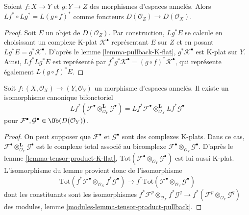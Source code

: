 \begin{lemma}

\label{lemma-derived-pullback-composition}
Soient $f : X \to Y$ et $g : Y \to Z$ des morphismes d'espaces annelés. Alors $Lf^* \circ Lg^* = L(g \circ f)^*$ comme foncteurs $D(\mathcal{O}_Z) \to D(\mathcal{O}_X)$.
\end{lemma}

\begin{proof}
Soit $E$ un objet de $D(\mathcal{O}_Z)$. Par construction, $Lg^*E$ se calcule en choisissant un complexe K-plat $\mathcal{K}^\bullet$ représentant $E$ sur $Z$ et en posant $Lg^*E = g^*\mathcal{K}^\bullet$. D'après le lemme \ref{lemma-pullback-K-flat}, $g^*\mathcal{K}^\bullet$ est K-plat sur $Y$. Ainsi, $Lf^*Lg^*E$ est représenté par $f^*g^*\mathcal{K}^\bullet = (g \circ f)^*\mathcal{K}^\bullet$, qui représente également $L(g \circ f)^*E$.
\end{proof}

\begin{lemma}

\label{lemma-pullback-tensor-product}
Soit $f : (X, \mathcal{O}_X) \to (Y, \mathcal{O}_Y)$ un morphisme d'espaces annelés. Il existe un isomorphisme canonique bifonctoriel $$
Lf^*(
\mathcal{F}^\bullet \otimes_{\mathcal{O}_Y}^{\mathbf{L}} \mathcal{G}^\bullet
) =
Lf^*\mathcal{F}^\bullet 
\otimes_{\mathcal{O}_X}^{\mathbf{L}}
Lf^*\mathcal{G}^\bullet 
$$ pour $\mathcal{F}^\bullet, \mathcal{G}^\bullet \in \Ob(D(\mathcal{O}_Y))$.
\end{lemma}

\begin{proof}
On peut supposer que $\mathcal{F}^\bullet$ et $\mathcal{G}^\bullet$ sont des complexes K-plats. Dans ce cas, $\mathcal{F}^\bullet \otimes_{\mathcal{O}_Y}^{\mathbf{L}} \mathcal{G}^\bullet$ est le complexe total associé au bicomplexe $\mathcal{F}^\bullet \otimes_{\mathcal{O}_Y} \mathcal{G}^\bullet$. D'après le lemme \ref{lemma-tensor-product-K-flat}, $\text{Tot}(\mathcal{F}^\bullet \otimes_{\mathcal{O}_Y} \mathcal{G}^\bullet)$ est lui aussi K-plat. L'isomorphisme du lemme provient donc de l'isomorphisme $$
\text{Tot}(f^*\mathcal{F}^\bullet \otimes_{\mathcal{O}_X}
f^*\mathcal{G}^\bullet)
\longrightarrow
f^*\text{Tot}(\mathcal{F}^\bullet \otimes_{\mathcal{O}_Y} \mathcal{G}^\bullet)
$$ dont les constituants sont les isomorphismes $f^*\mathcal{F}^p \otimes_{\mathcal{O}_X} f^*\mathcal{G}^q \to
f^*(\mathcal{F}^p \otimes_{\mathcal{O}_Y} \mathcal{G}^q)$ des modules, lemme \ref{modules-lemma-tensor-product-pullback}.
\end{proof}

